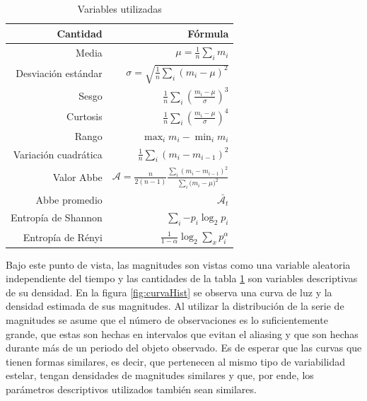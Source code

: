 \documentclass[letterpaper,12pt]{book}
\begin{document}
\begin{table}[ht]
  \centering
  \begin{tabular}{rr}
    \hline
    Cantidad & Fórmula  \\
    \hline
    Media& $\mu =\frac{1}{n}\sum_{i} m_{i}$ \\ 
    Desviación estándar& $\sigma = \sqrt{\frac{1}{n}\sum_{i} (m_{i}-\mu)^{2}}$ \\
    Sesgo & $\frac{1}{n}\sum_{i}{\left(\frac{m_{i}-\mu}{\sigma}\right)^{3}}$ \\
    Curtosis& $\frac{1}{n}\sum_{i}{\left(\frac{m_{i}-\mu}{\sigma}\right)^{4}}$ \\
    Rango& $\max_{i}m_{i} - \min_{i}m_{i}$ \\
    Variación cuadrática& $\frac{1}{n}\sum_{i}(m_{i}-m_{i-1})^{2}$ \\
    Valor Abbe \cite{mowlavi_searching_2014}& $\mathcal{A}=\frac{n}{2(n-1)}\frac{\sum_{i}{(m_{i}-m_{i-1})^{2}}}{\sum_{i}{(m_{i}-\mu})^2}$ \\
    Abbe promedio \cite{mowlavi_searching_2014}& $\bar{\mathcal{A}_{t}}$ \\
    Entropía de Shannon \cite{shannon_mathematical_1948} & $\sum_{i}{-p_{i}\log_{2}{p_{i}}}$ \\
    Entropía de Rényi\cite{renyi_measures_1961}& $\frac{1}{1-\alpha}\log_{2}{\sum_{x}p_{i}^{\alpha}}$\\
    \hline
  \end{tabular}
  \caption{Variables utilizadas}
  \label{cuadro:variablesUtilizadas}
\end{table}

Bajo este punto de vista, las magnitudes son vistas como una variable aleatoria independiente del tiempo y las cantidades de la tabla \ref{cuadro:variablesUtilizadas} son variables descriptivas de su densidad. En la figura \ref{fig:curvaHist} se observa una curva de luz y la densidad estimada de sus magnitudes. Al utilizar la distribución de la serie de magnitudes se asume que el número de observaciones es lo suficientemente grande, que estas son hechas en intervalos que evitan el aliasing y que son hechas durante más de un periodo del objeto observado. Es de esperar que las curvas que tienen formas similares, es decir, que pertenecen al mismo tipo de variabilidad estelar, tengan densidades de magnitudes similares y que, por ende, los parámetros descriptivos utilizados también sean similares.
\end{document}
